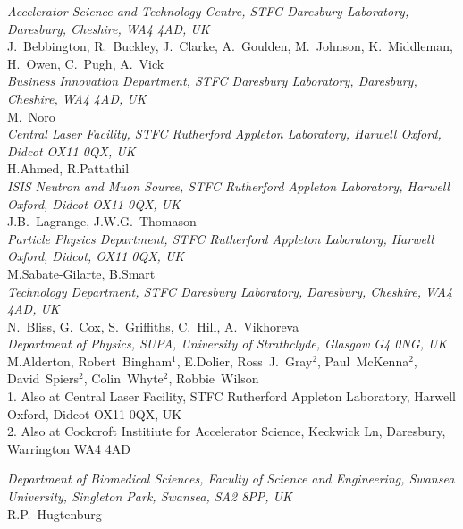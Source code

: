 \noindent \textit{Accelerator Science and Technology Centre, STFC Daresbury Laboratory, Daresbury, Cheshire, WA4 4AD, UK} \\
J.~Bebbington, R.~Buckley, J.~Clarke, A.~Goulden, M.~Johnson, K.~Middleman, H.~Owen, C.~Pugh, A.~Vick \\
 
\noindent \textit{Business Innovation Department, STFC Daresbury Laboratory, Daresbury, Cheshire, WA4 4AD, UK} \\
M.~Noro \\
 
\noindent \textit{Central Laser Facility, STFC Rutherford Appleton Laboratory, Harwell Oxford, Didcot OX11 0QX, UK} \\
H.Ahmed, R.Pattathil \\
 
\noindent \textit{ISIS Neutron and Muon Source, STFC Rutherford Appleton Laboratory, Harwell Oxford, Didcot OX11 0QX, UK} \\
J.B.~Lagrange, J.W.G.~Thomason \\
 
\noindent \textit{Particle Physics Department, STFC Rutherford Appleton Laboratory, Harwell Oxford, Didcot, OX11 0QX, UK} \\
M.Sabate-Gilarte, B.Smart \\
 
\noindent \textit{Technology Department, STFC Daresbury Laboratory, Daresbury, Cheshire, WA4 4AD, UK} \\
N.~Bliss, G.~Cox, S.~Griffiths, C.~Hill, A.~Vikhoreva \\
 
\noindent \textit{Department of Physics, SUPA, University of Strathclyde, Glasgow G4 0NG, UK} \\
M.Alderton, Robert~Bingham$^{1}$, E.Dolier, Ross~J.~Gray$^{2}$, Paul~McKenna$^{2}$, David~Spiers$^{2}$, Colin~Whyte$^{2}$, Robbie~Wilson \\
{\footnotesize
  1. Also at Central Laser Facility, STFC Rutherford Appleton Laboratory, Harwell Oxford, Didcot OX11 0QX, UK \\
  2. Also at Cockcroft Institiute for Accelerator Science, Keckwick Ln, Daresbury, Warrington WA4 4AD \\
}
 
\noindent \textit{Department of Biomedical Sciences, Faculty of Science and Engineering, Swansea University, Singleton Park, Swansea, SA2 8PP, UK} \\
R.P.~Hugtenburg \\
 
